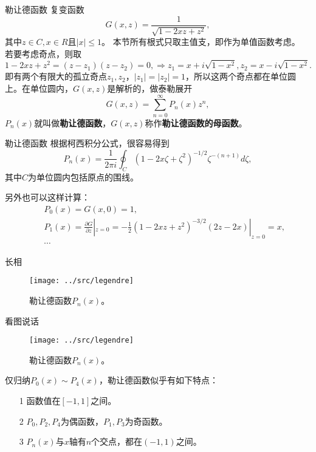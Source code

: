 \documentclass[11pt]{beamer}
\newcommand{\kong}[1][0.5]{\vspace{#1cm}}
\begin{document}
\begin{frame}{勒让德函数}
复变函数
\begin{equation}
G(x,z) = \frac{1}{ \sqrt{1-2xz+z^2} },
\end{equation}
其中$z \in C, x \in R$且$|x| \leq 1$。
本节所有根式只取主值支，即作为单值函数考虑。
若要考虑奇点，则取
\begin{equation}
1-2xz + z^2 = (z-z_1)(z-z_2) = 0, \Rightarrow z_1 = x + i \sqrt{1-x^2}, z_2 = x - i \sqrt{1-x^2}.
\end{equation}
即有两个有限大的孤立奇点$z_1, z_2$，$ |z_1| = |z_2| = 1$，所以这两个奇点都在单位圆上。在单位圆内，$G(x,z)$是解析的，做泰勒展开
\begin{equation}
G(x,z) = \sum^\infty_{n=0} P_n(x) z^n,
\end{equation}
$P_n(x)$就叫做{\bf 勒让德函数}，$G(x,z)$称作{\bf 勒让德函数的母函数}。
\end{frame}

\begin{frame}{勒让德函数}
根据柯西积分公式，很容易得到
\begin{equation}
P_n(x) = \frac{1}{2\pi i} \oint_C (1-2x\zeta + \zeta^2)^{-1/2} \zeta^{-(n+1)} d\zeta,
\end{equation}
其中$C$为单位圆内包括原点的围线。

\kong[0.5]
另外也可以这样计算：
\begin{eqnarray}
&& P_0(x) = G(x,0) = 1, \nonumber \\
&& P_1(x) = \frac{\partial G}{\partial z} |_{z=0} = -\frac{1}{2} (1-2xz+z^2)^{-3/2}(2z-2x) |_{z=0} = x, \nonumber\\
&& \cdots
\end{eqnarray}
\end{frame}

\begin{frame}{长相}

\begin{figure}
\centering
\texttt{[image: ../src/legendre]}
\caption{勒让德函数$P_n(x)$。}
\label{fig:legendre1}
\end{figure}
\end{frame}

\begin{frame}{看图说话}
\begin{figure}
\centering
\texttt{[image: ../src/legendre]}
\caption{勒让德函数$P_n(x)$。}
\label{fig:legendre2}
\end{figure}
仅归纳$P_0(x) \sim P_4(x)$，勒让德函数似乎有如下特点：
\begin{itemize}
\item [1] 函数值在$[-1,1]$之间。
\item [2] $P_0, P_2, P_4$为偶函数，$P_1,P_3$为奇函数。
\item [3] $P_n(x)$与$x$轴有$n$个交点，都在$(-1,1)$之间。
\end{itemize}

\end{frame}
\end{document}

